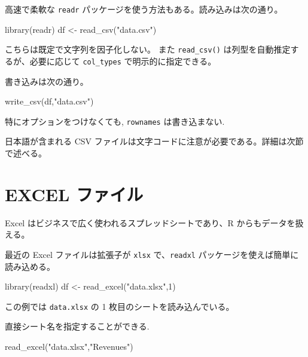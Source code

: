 \documentclass[
  letterpaper,
  xelatex,
  ja=standard, xelatex]{bxjsbook}
\newenvironment{Shaded}{\begin{snugshade}}{\end{snugshade}}
\newcommand{\DecValTok}[1]{\textcolor[rgb]{0.68,0.00,0.00}{#1}}
\newcommand{\FunctionTok}[1]{\textcolor[rgb]{0.28,0.35,0.67}{#1}}
\newcommand{\NormalTok}[1]{\textcolor[rgb]{0.00,0.23,0.31}{#1}}
\newcommand{\OtherTok}[1]{\textcolor[rgb]{0.00,0.23,0.31}{#1}}
\newcommand{\StringTok}[1]{\textcolor[rgb]{0.13,0.47,0.30}{#1}}
\begin{document}
高速で柔軟な \texttt{readr}
パッケージを使う方法もある。読み込みは次の通り。

\begin{Shaded}
\begin{Highlighting}[]
\FunctionTok{library}\NormalTok{(readr)}
\NormalTok{df }\OtherTok{\textless{}{-}} \FunctionTok{read\_csv}\NormalTok{(}\StringTok{"data.csv"}\NormalTok{)}
\end{Highlighting}
\end{Shaded}

こちらは既定で文字列を因子化しない。 また \texttt{read\_csv()}
は列型を自動推定するが、必要に応じて \texttt{col\_types}
で明示的に指定できる。

書き込みは次の通り。

\begin{Shaded}
\begin{Highlighting}[]
\FunctionTok{write\_csv}\NormalTok{(df,}\StringTok{"data.csv"}\NormalTok{)}
\end{Highlighting}
\end{Shaded}

特にオプションをつけなくても, \texttt{rownames} は書き込まない.

日本語が含まれる CSV
ファイルは文字コードに注意が必要である。詳細は次節で述べる。

\section{EXCEL ファイル}\label{excel-ux30d5ux30a1ux30a4ux30eb}

Excel はビジネスで広く使われるスプレッドシートであり、R
からもデータを扱える。

最近の Excel ファイルは拡張子が \texttt{xlsx} で、\texttt{readxl}
パッケージを使えば簡単に読み込める。

\begin{Shaded}
\begin{Highlighting}[]
\FunctionTok{library}\NormalTok{(readxl)}
\NormalTok{df }\OtherTok{\textless{}{-}} \FunctionTok{read\_excel}\NormalTok{(}\StringTok{"data.xlsx"}\NormalTok{,}\DecValTok{1}\NormalTok{)}
\end{Highlighting}
\end{Shaded}

この例では \texttt{data.xlsx} の 1 枚目のシートを読み込んでいる。

直接シート名を指定することができる.

\begin{Shaded}
\begin{Highlighting}[]
\FunctionTok{read\_excel}\NormalTok{(}\StringTok{"data.xlsx"}\NormalTok{,}\StringTok{"Revenues"}\NormalTok{)}
\end{Highlighting}
\end{Shaded}
\end{document}
